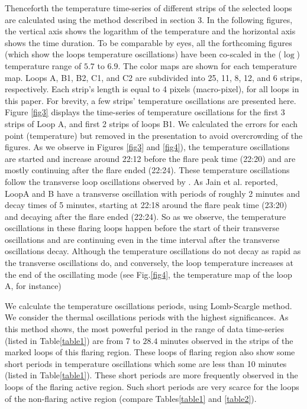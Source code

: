 \documentclass[oneside,onecolumn]{article}
\begin{document}
Thenceforth the temperature time-series of different strips of the selected loops are calculated using the method described in section 3. In the following figures, the vertical axis shows the logarithm of the temperature and the horizontal axis shows the time duration. To be comparable by eyes, all the forthcoming figures (which show the loops temperature oscillations) have been co-scaled in the ($\log$) temperature range of $5.7$ to $6.9$. The color maps are shown for each temperature map. 
Loops A, B1, B2, C1, and C2 are subdivided into 25, 11, 8, 12, and 6 strips, respectively. Each strip's length is equal to 4 pixels (macro-pixel), for all loops in this paper. For brevity, a few strips' temperature oscillations are presented here. Figure \ref{fig3} displays the time-series of temperature oscillations for the first 3 strips of Loop A, and first 2 strips of loops B1. We calculated the errors for each point (temperature) but removed in the presentation to avoid overcrowding of the figures. As we observe in Figures \ref{fig3} and \ref{fig4}), the temperature oscillations are started and increase around 22:12 before the flare peak time (22:20) and are mostly continuing after the flare ended (22:24). These temperature oscillations follow the transverse loop oscillations observed by \citet{ref:Jain2015}. As Jain et al. reported, LoopA and B have a transverse oscillation with periods of roughly 2 minutes and decay times of 5 minutes, starting at 22:18 around the flare peak time (23:20) and decaying after the flare ended (22:24). So as we observe, the temperature oscillations in these flaring loops happen before the start of their transverse oscillations and are continuing even in the time interval after the transverse oscillations decay. Although the temperature oscillations do not decay as rapid as the transverse oscillations do, and conversely, the loop temperature increases at the end of the oscillating mode (see Fig.\ref{fig4}, the temperature map of the loop A, for instance) 

We calculate the temperature oscillations periods, using Lomb-Scargle method. We consider the thermal oscillations periods with the highest significances. As this method shows, the most powerful period in the range of data time-series (listed in Table\ref{table1}) are from 7 to $28.4$ minutes observed in the strips of the marked loops of this flaring region. These loops of flaring region also show some short periods in temperature oscillations which some are less than 10 minutes (listed in Table\ref{table1}). These short periods are more frequently observed in the loops of the flaring active region. Such short periods are very scarce for the loops of the non-flaring active region (compare Tables\ref{table1} and \ref{table2}). 
\end{document}
